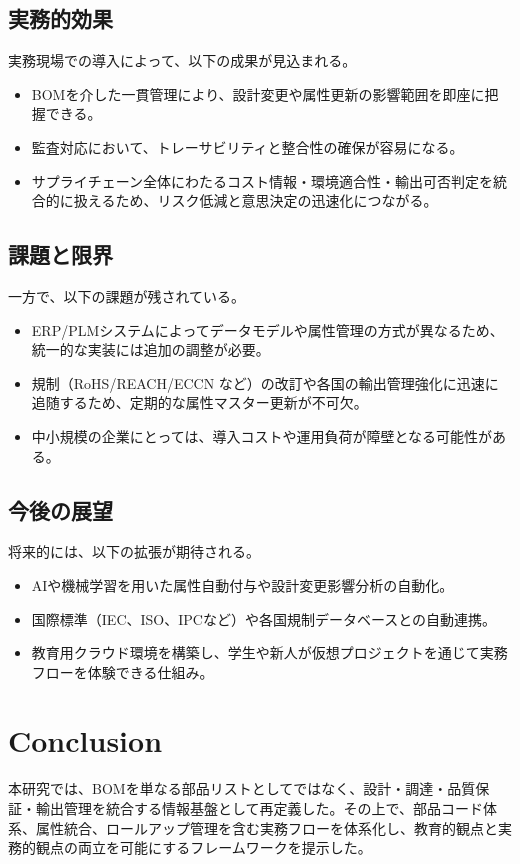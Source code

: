 \documentclass[10pt,conference]{IEEEtran}
\begin{document}
\subsection{実務的効果}
実務現場での導入によって、以下の成果が見込まれる。
\begin{itemize}
  \item BOMを介した一貫管理により、設計変更や属性更新の影響範囲を即座に把握できる。
  \item 監査対応において、トレーサビリティと整合性の確保が容易になる。
  \item サプライチェーン全体にわたるコスト情報・環境適合性・輸出可否判定を統合的に扱えるため、リスク低減と意思決定の迅速化につながる。
\end{itemize}

\subsection{課題と限界}
一方で、以下の課題が残されている。
\begin{itemize}
  \item ERP/PLMシステムによってデータモデルや属性管理の方式が異なるため、統一的な実装には追加の調整が必要。
  \item 規制（RoHS/REACH/ECCN など）の改訂や各国の輸出管理強化に迅速に追随するため、定期的な属性マスター更新が不可欠。
  \item 中小規模の企業にとっては、導入コストや運用負荷が障壁となる可能性がある。
\end{itemize}

\subsection{今後の展望}
将来的には、以下の拡張が期待される。
\begin{itemize}
  \item AIや機械学習を用いた属性自動付与や設計変更影響分析の自動化。
  \item 国際標準（IEC、ISO、IPCなど）や各国規制データベースとの自動連携。
  \item 教育用クラウド環境を構築し、学生や新人が仮想プロジェクトを通じて実務フローを体験できる仕組み。
\end{itemize}

\section{Conclusion}
本研究では、BOMを単なる部品リストとしてではなく、設計・調達・品質保証・輸出管理を統合する情報基盤として再定義した。その上で、部品コード体系、属性統合、ロールアップ管理を含む実務フローを体系化し、教育的観点と実務的観点の両立を可能にするフレームワークを提示した。
\end{document}
